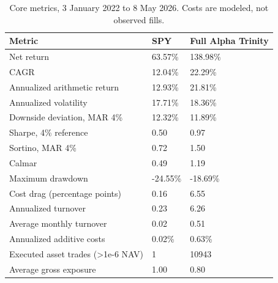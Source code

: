\begin{table}[htbp]
\caption{Core metrics, 3 January 2022 to 8 May 2026. Costs are modeled, not observed fills.}
\label{tab:metrics}
\begin{tabular}{lll}
\toprule
Metric & SPY & Full Alpha Trinity \\
\midrule
Net return & 63.57\% & 138.98\% \\
CAGR & 12.04\% & 22.29\% \\
Annualized arithmetic return & 12.93\% & 21.81\% \\
Annualized volatility & 17.71\% & 18.36\% \\
Downside deviation, MAR 4\% & 12.32\% & 11.89\% \\
Sharpe, 4\% reference & 0.50 & 0.97 \\
Sortino, MAR 4\% & 0.72 & 1.50 \\
Calmar & 0.49 & 1.19 \\
Maximum drawdown & -24.55\% & -18.69\% \\
Cost drag (percentage points) & 0.16 & 6.55 \\
Annualized turnover & 0.23 & 6.26 \\
Average monthly turnover & 0.02 & 0.51 \\
Annualized additive costs & 0.02\% & 0.63\% \\
Executed asset trades (>1e-6 NAV) & 1 & 10943 \\
Average gross exposure & 1.00 & 0.80 \\
\bottomrule
\end{tabular}
\end{table}

